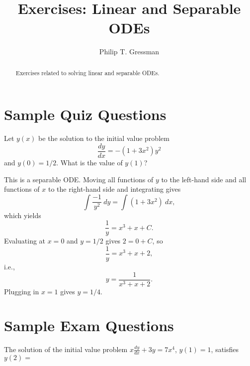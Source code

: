 \documentclass{ximera}
\title{Exercises: Linear and Separable ODEs}
\author{Philip T. Gressman}
\begin{document}
\begin{abstract}
Exercises related to solving linear and separable ODEs.
\end{abstract}
\maketitle

\section*{Sample Quiz Questions}

\begin{question}%

Let \(y(x)\) be the solution to the initial value problem \[  \frac{dy}{dx}  = -(1 + 3 x^2)y^2\] and \(y(0) = 1/2\).  What is the value of \(y(1)\)?
\begin{multiplechoice}
\end{multiplechoice}
\begin{feedback}
This is a separable ODE. Moving all functions of \(y\) to the left-hand side and all functions of \(x\) to the right-hand side and integrating gives \[\int  \frac{ -1  }{ y^2} ~ dy = \int (1 + 3 x^2) ~ dx, \] which yields \[\frac{1}{y} = x^3 + x + C.\] Evaluating at \(x = 0\) and \(y = 1/2\) gives \(2 = 0 + C\), so \[\frac{1}{y} = x^3 + x + 2,\] i.e., \[y = \frac{1}{x^3 + x + 2}.\] Plugging in \(x = 1\) gives \(y = 1/4\).
\end{feedback}

\end{question}

\section*{Sample Exam Questions}

\begin{question}%

The solution of the initial value problem \(\displaystyle x \frac{dy}{dx} + 3y = 7 x^4\),  \(y(1) = 1\),
satisfies \(y(2) = \)
\begin{multiplechoice}
\end{multiplechoice}

\end{question}
\end{document}
